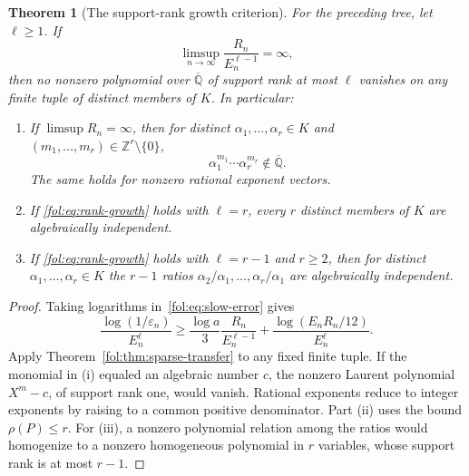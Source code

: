 \documentclass[11pt,a4paper]{article}
\newtheorem{theorem}{Theorem}[section]
\theoremstyle{definition}
\theoremstyle{remark}
\numberwithin{equation}{section}
\begin{document}
\begin{theorem}[The support-rank growth criterion]
\label{fol:thm:rank-growth}
For the preceding tree, let $\ell\ge1$. If
\begin{equation}\label{fol:eq:rank-growth}
 \limsup_{n\to\infty}\frac{R_n}{E_n^{\ell-1}}=\infty,
\end{equation}
then no nonzero polynomial over $\overline{\mathbb Q}$ of support rank
at most $\ell$ vanishes on any finite tuple of distinct members of $K$.
In particular:
\begin{enumerate}
\item If $\limsup R_n=\infty$, then for distinct
$\alpha_1,\ldots,\alpha_r\in K$ and
$(m_1,\ldots,m_r)\in\mathbb Z^r\setminus\{0\}$,
\begin{equation}\label{fol:eq:monomial-transcendence}
 \alpha_1^{m_1}\cdots\alpha_r^{m_r}
       \notin\overline{\mathbb Q}.
\end{equation}
The same holds for nonzero rational exponent vectors.
\item If \eqref{fol:eq:rank-growth} holds with $\ell=r$, every $r$ distinct
members of $K$ are algebraically independent.
\item If \eqref{fol:eq:rank-growth} holds with $\ell=r-1$ and $r\ge2$,
then for distinct $\alpha_1,\ldots,\alpha_r\in K$ the $r-1$ ratios
$\alpha_2/\alpha_1,\ldots,\alpha_r/\alpha_1$ are algebraically independent.
\end{enumerate}
\end{theorem}

\begin{proof}
Taking logarithms in~\eqref{fol:eq:slow-error} gives
\[
 \frac{\log(1/\varepsilon_n)}{E_n^\ell}
 \ge\frac{\log a}{3}\frac{R_n}{E_n^{\ell-1}}
       +\frac{\log(E_nR_n/12)}{E_n^\ell}.
\]
Apply Theorem~\ref{fol:thm:sparse-transfer} to any fixed finite tuple.
If the monomial in (i) equaled an algebraic number $c$, the nonzero
Laurent polynomial $X^m-c$, of support rank one, would vanish. Rational
exponents reduce to integer exponents by raising to a common positive
denominator. Part (ii) uses the bound $\rho(P)\le r$.
For (iii), a nonzero polynomial relation among the ratios would
homogenize to a nonzero homogeneous polynomial in $r$ variables, whose
support rank is at most $r-1$.
\end{proof}
\end{document}
